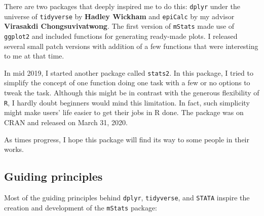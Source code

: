 \documentclass[
]{book}
\begin{document}
There are two packages that deeply inspired me to do this: \texttt{dplyr} under the universe of \texttt{tidyverse} by \textbf{Hadley Wickham} and \texttt{epiCalc} by my advisor \textbf{Virasakdi Chongsuvivatwong}. The first version of \texttt{mStats} made use of \texttt{ggplot2} and included functions for generating ready-made plots. I released several small patch versions with addition of a few functions that were interesting to me at that time.

In mid 2019, I started another package called \texttt{stats2}. In this package, I tried to simplify the concept of one function doing one task with a few or no options to tweak the task. Although this might be in contrast with the generous flexibility of \texttt{R}, I hardly doubt beginners would mind this limitation. In fact, such simplicity might make users' life easier to get their jobs in R done. The package was on CRAN and released on March 31, 2020.

As times progress, I hope this package will find its way to some people in their works.

\hypertarget{guiding-principles}{%
\subsection{Guiding principles}\label{guiding-principles}}

Most of the guiding principles behind \texttt{dplyr}, \texttt{tidyverse}, and \texttt{STATA} inspire the creation and development of the \texttt{mStats} package:
\end{document}
